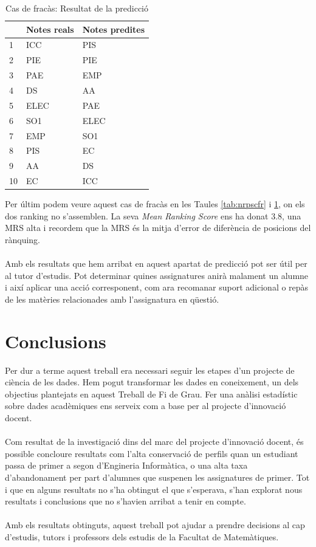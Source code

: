 \documentclass[12pt,a4paper,catalan]{article}
\begin{document}
\begin{table}[h]
\centering
\begin{tabular}{@{}lll@{}}
\toprule
     & Notes reals & Notes predites \\ \midrule
1    & ICC    & PIS       \\
2    & PIE    & PIE      \\
3    & PAE    & EMP       \\
4    & DS     & AA      \\
5    & ELEC   & PAE       \\
6    & SO1    & ELEC        \\
7    & EMP    & SO1       \\
8    & PIS    & EC      \\
9    & AA     & DS       \\
10   & EC     & ICC        \\ \bottomrule
\end{tabular}
\caption{Cas de fracàs: Resultat de la predicció}
\label{tab:rpscfr}
\end{table}

Per últim podem veure aquest cas de fracàs en les Taules \ref{tab:nrpscfr} i \ref{tab:rpscfr}, on els dos ranking no s'assemblen. La seva \textit{Mean Ranking Score} ens ha donat 3.8, una MRS alta i recordem que la MRS és la mitja d'error de diferència de posicions del rànquing.
\\
\\
Amb els resultats que hem arribat en aquest apartat de predicció pot ser útil per al tutor d'estudis. Pot determinar quines assignatures anirà malament un alumne i així aplicar una acció corresponent, com ara recomanar suport adicional o repàs de les matèries relacionades amb l'assignatura en qüestió.

\newpage
\section{Conclusions}
Per dur a terme aquest treball era necessari seguir les etapes d'un projecte de ciència de les dades. Hem pogut transformar les dades en coneixement, un dels objectius plantejats en aquest Treball de Fi de Grau. Fer una anàlisi estadístic sobre dades acadèmiques ens serveix com a base per al projecte d'innovació docent.
\\
\\
Com resultat de la investigació dins del marc del projecte d'innovació docent, és possible concloure resultats com l'alta conservació de perfils quan un estudiant passa de primer a segon d'Engineria Informàtica, o una alta taxa d'abandonament per part d'alumnes que suspenen les assignatures de primer. Tot i que en alguns resultats no s'ha obtingut el que s'esperava, s'han explorat nous resultats i conclusions que no s'havien arribat a tenir en compte.
\\
\\
Amb els resultats obtinguts, aquest treball pot ajudar a prendre decisions al cap d'estudis, tutors i professors dels estudis de la Facultat de Matemàtiques.
\end{document}
